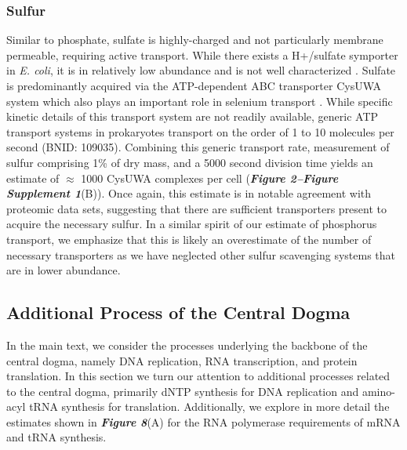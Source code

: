 \subsubsection{Sulfur}
Similar to phosphate, sulfate is highly-charged and not particularly membrane
permeable, requiring active transport. While there exists a H+/sulfate
symporter in \textit{E. coli}, it is in relatively low abundance and is not
well characterized \citep{zhang2014}. Sulfate is predominantly acquired via
the ATP-dependent ABC transporter CysUWA system which also plays an important
role in selenium transport \citep{sekowska2000, sirko1995}. While specific
kinetic details of this transport system are not readily available, generic
ATP transport systems in prokaryotes transport on the order of 1 to 10
molecules per second (BNID: 109035). Combining this generic transport rate,
measurement of sulfur comprising 1\% of dry mass, and a 5000 second division
time yields an estimate of $\approx$ 1000 CysUWA complexes per cell
(\textbf{\textit{Figure 2–Figure Supplement 1}}(B)). Once again, this estimate is in notable
agreement with proteomic data sets, suggesting that there are sufficient
transporters present to acquire the necessary sulfur. In a similar spirit of
our estimate of phosphorus transport, we emphasize that this is likely an
overestimate of the number of necessary transporters as we have neglected
other sulfur scavenging systems that are in lower abundance.



\subsection{Additional Process of the Central Dogma}
\label{sec:SI_central_dogma}
In the main text, we consider the processes underlying the backbone of the
central dogma, namely DNA replication, RNA transcription, and protein
translation. In this section we turn our attention to additional processes
related to the central dogma, primarily dNTP synthesis for DNA replication and
amino-acyl tRNA synthesis for translation. Additionally, we explore in more
detail the estimates shown in \textbf{\textit{Figure 8}}(A) for the RNA polymerase
requirements of mRNA and tRNA synthesis.

